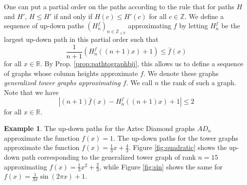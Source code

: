 \documentclass[12pt]{amsart}
\newcommand{\Z}{{\mathbb Z}}
\newcommand{\R}{{\mathbb R}}
\numberwithin{equation}{section}
\theoremstyle{definition}
\newtheorem{example}[thm]{Example}
\begin{document}
One can put a partial order on the paths according to the rule that for paths $H$ and $H'$, $H\le H'$ if and only if $H(c)\le H'(c)$ for all $c\in\Z$. We define a sequence of up-down paths $(H_n^f)_{n\in\Z_{\ge 0}}$ approximating $f$ by letting $H_n^f$ be the largest up-down path in this partial order such that
\begin{equation}\label{eq:approxPath}
    \frac{1}{n+1}\left(H_n^f((n+1)x) + 1\right) \le \bar f(x)
\end{equation}
for all $x\in \R$. By Prop. \ref{prop:pathtographbij}, this allows us to define a sequence of graphs whose column heights approximate $f$. We denote these graphs \emph{generalized tower graphs approximating $f$}. We call $n$ the rank of such a graph. Note that we have
\begin{equation}\label{eq:error}
    \left| (n+1)\bar f(x) - H_n^f((n+1)x) + 1\right| \le 2
\end{equation}
for all $x\in \R$.

\begin{example}
    The up-down paths for the Aztec Diamond graphs $AD_n$ approximate the function $f(x)=1$. The up-down paths for the tower graphs approximate the function $f(x) = \frac{1}{3}x + \frac{4}{3}$. Figure \ref{fig:quadratic} shows the up-down path corresponding to the generalized tower graph of rank $n=15$ approximating $f(x) = \frac{1}{3}x^2+\frac{2}{3}$, while Figure \ref{fig:sin} shows the same for $f(x) = \frac{1}{3\pi}\sin(2\pi x) + 1$.
\end{example}
\end{document}
